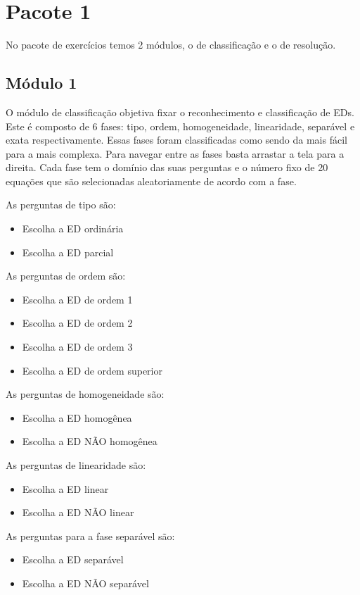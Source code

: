
\section[Pacote 1]{Pacote 1}
No pacote de exercícios temos 2 módulos, o de classificação e o de resolução.

\subsection[Módulo 1]{Módulo 1}
O módulo de classificação objetiva fixar o reconhecimento e classificação de EDs. Este é composto de 6 fases: tipo, ordem, homogeneidade, linearidade, separável e exata respectivamente. Essas fases foram classificadas como sendo da mais fácil para a mais complexa. Para navegar entre as fases basta arrastar a tela para a direita.
Cada fase tem o domínio das suas perguntas e o número fixo de 20 equações que são selecionadas aleatoriamente de acordo com a fase.

As perguntas de tipo são: 
\begin{itemize}
	\item{}Escolha a ED ordinária
	\item{}Escolha a ED parcial
\end{itemize}


As perguntas de ordem são:
\begin{itemize}
	\item{}Escolha a ED de ordem 1
	\item{}Escolha a ED de ordem 2
	\item{}Escolha a ED de ordem 3
	\item{}Escolha a ED de ordem superior
\end{itemize}
 	

As perguntas de homogeneidade são:
\begin{itemize}
	\item{}Escolha a ED homogênea
	\item{}Escolha a ED NÃO homogênea
\end{itemize}
					
 
As perguntas de linearidade são:
\begin{itemize}
	\item{}Escolha a ED linear
	\item{}Escolha a ED NÃO linear
\end{itemize} 

As perguntas para a fase separável são:
\begin{itemize}
	\item{}Escolha a ED separável
	\item{}Escolha a ED NÃO separável
\end{itemize}

